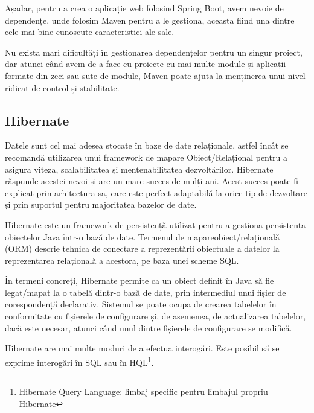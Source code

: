 Așadar, pentru a crea o aplicație web folosind Spring Boot, avem nevoie de dependențe, unde folosim Maven pentru a le gestiona, aceasta fiind una dintre cele mai bine cunoscute caracteristici ale sale.\newline

Nu există mari dificultăți în gestionarea dependențelor pentru un singur proiect, dar atunci când avem de-a face cu proiecte cu mai multe module și aplicații formate din zeci sau sute de module, Maven poate ajuta la menținerea unui nivel ridicat de control și stabilitate.\newline

\subsection{Hibernate}

Datele sunt cel mai adesea stocate în baze de date relaționale, astfel încât se recomandă utilizarea unui framework de mapare Obiect/Relațional pentru a asigura viteza, scalabilitatea și mentenabilitatea dezvoltărilor. Hibernate\cite{.hibernate} răspunde acestei nevoi și are un mare succes de mulți ani. Acest succes poate fi explicat prin arhitectura sa, care este perfect adaptabilă la orice tip de dezvoltare și prin suportul pentru majoritatea bazelor de date.\newline

Hibernate este un framework de persistență utilizat pentru a gestiona persistența obiectelor Java într-o bază de date. Termenul de mapare\newline obiect/relațională (ORM) descrie tehnica de conectare a reprezentării obiectuale a datelor la reprezentarea relațională a acestora, pe baza unei scheme SQL.\newline

În termeni concreți, Hibernate permite ca un obiect definit în Java să fie legat/mapat la o tabelă dintr-o bază de date, prin intermediul unui fișier de corespondență declarativ. Sistemul se poate ocupa de crearea tabelelor în conformitate cu fișierele de configurare și, de asemenea, de actualizarea tabelelor, dacă este necesar, atunci când unul dintre fișierele de configurare se modifică.\newline

Hibernate are mai multe moduri de a efectua interogări. Este posibil să se exprime interogări în SQL sau în HQL\footnote{Hibernate Query Language: limbaj specific pentru limbajul propriu Hibernate}.\newline

